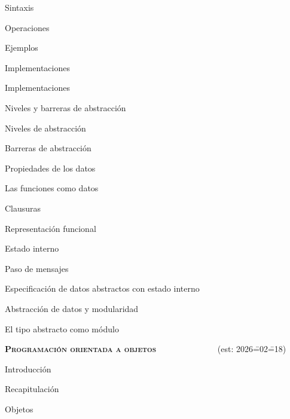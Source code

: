 \begin{longenum}
\begin{longenum}
\begin{longenum}
            \item Sintaxis
            \item Operaciones
            \item Ejemplos
        \end{longenum}
        \item Implementaciones
        \begin{longenum}
            \item Implementaciones
        \end{longenum}
        \item Niveles y barreras de abstracción
        \begin{longenum}
            \item Niveles de abstracción
            \item Barreras de abstracción
            \item Propiedades de los datos
        \end{longenum}
        \item Las funciones como datos
        \begin{longenum}
            \item Clausuras
            \item Representación funcional
            \item Estado interno
            \item Paso de mensajes
            \item Especificación de datos abstractos con estado interno
        \end{longenum}
        \item Abstracción de datos y modularidad
        \begin{longenum}
            \item El tipo abstracto como módulo
        \end{longenum}
    \end{longenum}
    \item \textbf{\textsc{Programación orientada a objetos}} \ \ \ \ \ \ \ \ \ \ \ \ \ \ (est: 2026\==02\==18)
    \begin{longenum}
        \item Introducción
        \begin{longenum}
            \item Recapitulación
            \item Objetos
        \end{longenum}

\end{longenum}
\end{longenum}
